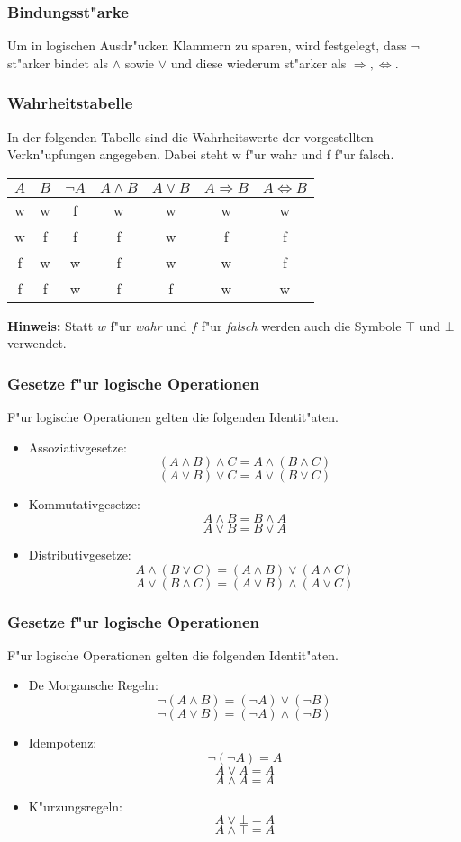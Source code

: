 \documentclass{beamer}
\begin{document}
\begin{frame}
  \frametitle{Bindungsst"arke}
  Um in logischen Ausdr"ucken Klammern zu sparen, wird festgelegt, dass $\neg$ st"arker bindet als $\wedge$ sowie $\vee$ und diese wiederum st"arker als $\Rightarrow, \Leftrightarrow$.
\end{frame}

\begin{frame}
  \frametitle{Wahrheitstabelle}
  In der folgenden Tabelle sind die Wahrheitswerte der vorgestellten Verkn"upfungen angegeben. Dabei steht w f"ur wahr und f f"ur falsch.
  \begin{tabular}[h]{c|c|c|c|c|c|c}
   
    $A$ & $B$ & $\neg A$ & $A\wedge B$ & $A\vee B$ & $A\Rightarrow B$ & $A\Leftrightarrow B$ \\
    \hline
    w & w & f & w & w & w & w \\
    w & f & f & f & w & f & f \\
    f & w & w & f & w & w & f \\
    f & f & w & f & f & w & w
    
  \end{tabular}
  
  \vspace{5mm}
  \textbf{Hinweis:} Statt $w$ f"ur \textit{wahr} und $f$ f"ur \textit{falsch} werden auch die Symbole $\top$ und $\bot$ verwendet.
  
\end{frame}

\begin{frame}
  \frametitle{Gesetze f"ur logische Operationen}
  F"ur logische Operationen gelten die folgenden Identit"aten. 
  \begin{itemize}
    \item Assoziativgesetze: \[(A\wedge B)\wedge C = A\wedge(B\wedge C)\] \[(A\vee B)\vee C = A\vee(B\vee C)\]
    \item Kommutativgesetze: \[A\wedge B = B\wedge A\]\[A\vee B = B\vee A\]
    \item Distributivgesetze: \[A \wedge (B\vee C) = (A\wedge B)\vee (A\wedge C)\] \[A\vee (B\wedge C) = (A\vee B)\wedge (A\vee C)\]
  \end{itemize}
   
\end{frame}


\begin{frame}
  \frametitle{Gesetze f"ur logische Operationen}
  F"ur logische Operationen gelten die folgenden Identit"aten. 
  \begin{itemize}
    \item De Morgansche Regeln: \[\neg(A\wedge B) = (\neg A)\vee(\neg B)\]\[\neg(A\vee B) = (\neg A)\wedge(\neg B)\]
    \item Idempotenz: \[\neg(\neg A) = A\]\[A\vee A = A\]\[A\wedge A = A\]
    \item K"urzungsregeln: \[A\vee\bot=A\]\[A\wedge\top=A\]
  \end{itemize}
   
\end{frame}
\end{document}
